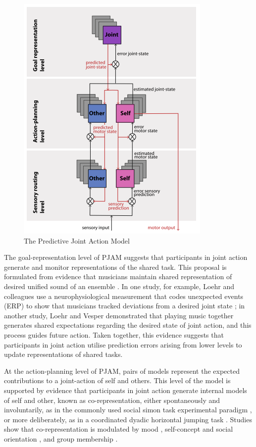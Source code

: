 \begin{CJK}{UTF8}{gbsn}
\begin{figure}[htbp]
  \begin{center}
    \includegraphics[scale=.8]{images/PJAM.png}
      \caption{The Predictive Joint Action Model \citep{Pesquita2017}}
        \label{fig:PJAM}
   \end{center}
\end{figure}

The goal-representation level of PJAM suggests that participants in joint action generate and monitor representations of the shared task. This proposal is formulated from evidence that musicians maintain shared representation of desired unified sound of an ensemble \citep{Keller2008}.  In one study, for example, Loehr and colleagues  use a neurophysiological measurement that codes unexpected events (ERP) to show that musicians tracked deviations from a desired joint state \citep{Loehr2013}; in another study, Loehr and Vesper \textcite{Loehr2016} demonstrated that playing music together generates shared expectations regarding the desired state of joint action, and this process guides future action.  Taken together, this evidence suggests that participants in joint action utilise prediction errors arising from lower levels to update representations of shared tasks.

At the action-planning level of PJAM, pairs of models represent the expected contributions to a joint-action of self and others.  This level of the model is supported by evidence that participants in joint action generate internal models of self and other, known as co-representation, either spontaneously and involuntarily, as in the commonly used social simon task experimental paradigm \citep{Sebanz2003,Atmaca2008}, or more deliberately, as in a coordinated dyadic horizontal jumping task \citep{Vesper2012}.  Studies show that co-representation is modulated by mood \citep[positive or negative affect, see][]{Kuhbandner2010}, self-concept and social orientation \citep{Colzato2012,Colzato2012a}, and group membership \citep{DeBruijn2008,Iani2013}.


\end{CJK}
